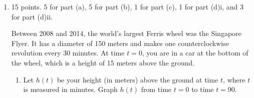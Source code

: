 \documentclass{article}
\begin{document}
\begin{enumerate}[topsep=0pt]
\begin{multicols}{2}
\begin{enumerate}
      \begin{solution}
        This graph has amplitude $2$, balance value $3$, and period $2$
        (there are three half-periods between $x = - \frac{5}{2}$ and $x =
        \frac{1}{2}$).  At $x = 0$, the graph is at its balance value and
        decreasing, so it seems easiest to model this by starting with $y
        = - \sin x$.  If we stretch this vertically by a factor of 2,
        stretch it horizontally by a factor of $\frac{1}{\pi}$, and shift
        it up by $3$, we'll end up with the graph we want.  Therefore, one
        model is $\boxed{y = -2 \sin (\pi x) + 3}$.

        \checkmark
          Let's check by plugging in $x = - \frac{5}{2}$ and $x =
          \frac{1}{2}$.  When $x = - \frac{5}{2}$, $y = - 2 \sin \left( -
            \frac{5 \pi}{2} \right) + 3 = -2(-1) + 3 = 5$; when $x =
          \frac{1}{2}$, $y = -2 \sin \left( \frac{\pi}{2} \right) + 3 =
          1$, which agrees with the points we're given.
        
      \end{solution}

    \end{enumerate} 
    \end{multicols}



\item 

\begin{grading}
15 points. 5 for part (a), 5 for part (b), 1 for part (c), 1 for part (d)i, and 3 for part (d)ii.
\end{grading}


Between 2008 and 2014, the world's largest Ferris wheel was the
  Singapore Flyer. It has a diameter of 150 meters and makes one
  counterclockwise revolution every $30$ minutes.  At time $t = 0$, you
  are in a car at the bottom of the wheel, which is a height of 15 meters
  above the ground.

  \begin{enumerate}[topsep=0pt]
  \item
    \begin{problem}[\stretch{2}]
      Let $h(t)$ be your height (in meters) above the ground at time $t$,
      where $t$ is measured in minutes.  Graph $h(t)$ from time $t=0$ to
      time $t=90$.
    \end{problem}


\end{enumerate}
\end{enumerate}
\end{document}
